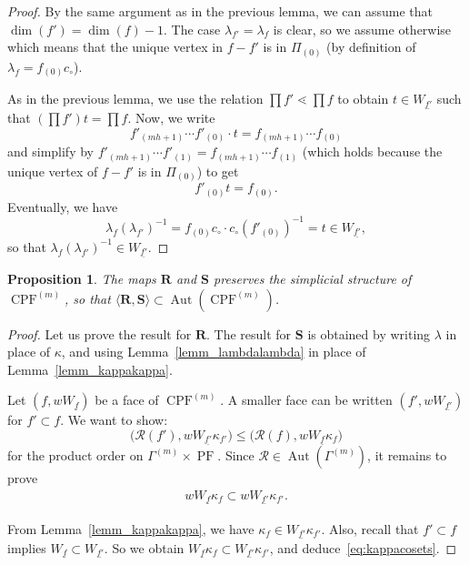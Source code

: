\documentclass[11pt]{article}
\newtheorem{prop}[theo]{Proposition}
\theoremstyle{definition}
\DeclareMathOperator{\Aut}{Aut}
\newcommand{\RR}{\mathcal{R}}
\newcommand{\RRR}{\mathbf{R}}
\newcommand{\SSS}{\mathbf{S}}
\DeclareMathOperator{\CPF}{CPF}
\DeclareMathOperator{\PF}{PF}
\begin{document}
\begin{proof}
    By the same argument as in the previous lemma, we can assume that $\dim(f') = \dim(f)-1$.  The case  $\lambda_{f'} = \lambda_{f}$ is clear, so we assume otherwise which means that the unique vertex in $f - f'$ is in $\varPi_{(0)}$ (by definition of $\lambda_f = f_{(0)}c_\circ$).

    As in the previous lemma, we use the relation $\prod f' \lessdot \prod f$ to obtain $t\in W_{\underline{f'}}$ such that $(\prod f')t = \prod f$.  Now, we write 
    \[
        f'_{(mh+1)} \cdots f'_{(0)} \cdot t
            =
        f_{(mh+1)} \cdots f_{(0)}
    \]
    and simplify by $f'_{(mh+1)} \cdots f'_{(1)} = f_{(mh+1)} \cdots f_{(1)} $ (which holds because the unique vertex of $f-f'$ is in $\varPi_{(0)} $) to get 
    \[
        f'_{(0)} t = f_{(0)}.
    \]
    Eventually, we have
    \[
        \lambda_{f} (\lambda_{f'})^{-1}
            =
        f_{(0)} c_\circ \cdot c_\circ (f'_{(0)})^{-1}
            =
        t \in W_{\underline{f'}},
    \]
    so that $\lambda_{f} (\lambda_{f'})^{-1} \in W_{\underline{f'}}$.
\end{proof}

\begin{prop}
    The maps $\RRR$ and $\SSS$ preserves the simplicial structure of $\CPF^{(m)}$, so that $\langle\RRR,\SSS\rangle \subset \Aut(\CPF^{(m)})$.
\end{prop}

\begin{proof}
    Let us prove the result for $\RRR$.  The result for $\SSS$ is obtained by writing $\lambda$ in place of $\kappa$, and using Lemma~\ref{lemm_lambdalambda} in place of Lemma~\ref{lemm_kappakappa}.

    Let $(f,wW_{\underline{f}})$ be a face of $\CPF^{(m)}$.  A smaller face can be written $(f',wW_{\underline{f'}})$ for $f'\subset f$.  We want to show:
    \[
        \big(\RR(f'), wW_{\underline{f'}}\kappa_{f'}\big) 
            \leq
        \big( \RR(f), wW_{\underline{f}}\kappa_f\big)
    \]
    for the product order on $\Gamma^{(m)}\times\PF$.  Since $\RR\in\Aut(\Gamma^{(m)})$, it remains to prove 
    \begin{align} \label{eq:kappacosets}
        wW_{\underline{f}}
        \kappa_f
            \subset
        wW_{\underline{f'}}
        \kappa_{f'}.
    \end{align}

    From Lemma~\ref{lemm_kappakappa}, we have $\kappa_f \in W_{\underline{f'}} \kappa_{f'}$.  Also, recall that $f'\subset f$ implies $W_{\underline{f}} \subset W_{\underline{f'}}$.  So we obtain $W_{\underline{f}} \kappa_f \subset W_{\underline{f'}} \kappa_{f'}$, and deduce~\eqref{eq:kappacosets}.
\end{proof}
\end{document}
